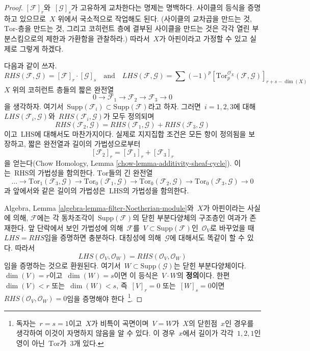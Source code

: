 \begin{proof}
$[\mathcal{F}]_r$와\  $[\mathcal{G}]_s$가 고유하게 교차한다는 명제는
명백하다. 사이클의 등식을 증명하고 있으므로\  $X$ 위에서 국소적으로
작업해도 된다. (사이클의 교차곱을 만드는 것, $\text{Tor}$-층을 만드는 것,
그리고 코히런트 층에 결부된 사이클을 만드는 것은 각각 열린 부분스킴으로의
제한과 가환함을 관찰하라.) 따라서\  $X$가 아핀이라고 가정할 수 있고 실제로
그렇게 하겠다.

\medskip\noindent
다음과 같이 쓰자.
$$
RHS(\mathcal{F}, \mathcal{G}) = [\mathcal{F}]_r \cdot [\mathcal{G}]_s
\quad\text{and}\quad
LHS(\mathcal{F}, \mathcal{G}) = \sum (-1)^p
[\text{Tor}_p^{\mathcal{O}_X}(\mathcal{F}, \mathcal{G})]_{r + s - \dim(X)}
$$
$X$ 위의 코히런트 층들의 짧은 완전열
$$
0 \to \mathcal{F}_1 \to \mathcal{F}_2 \to \mathcal{F}_3 \to 0
$$
을 생각하자. 여기서\ 
$\text{Supp}(\mathcal{F}_i) \subset \text{Supp}(\mathcal{F})$라고 하자.
그러면\  $i = 1, 2, 3$에 대해\  $LHS(\mathcal{F}_i, \mathcal{G})$와\ 
$RHS(\mathcal{F}_i, \mathcal{G})$가 모두 정의되며
$$
RHS(\mathcal{F}_2, \mathcal{G}) =
RHS(\mathcal{F}_1, \mathcal{G}) + RHS(\mathcal{F}_3, \mathcal{G})
$$
이고\  LHS에 대해서도 마찬가지이다. 실제로 지지집합 조건은 모든 항이
정의됨을 보장하고, 짧은 완전열과 길이의 가법성으로부터
$$
[\mathcal{F}_2]_r = [\mathcal{F}_1]_r  + [\mathcal{F}_3]_r
$$
을 얻는다(Chow Homology, Lemma \ref{chow-lemma-additivity-sheaf-cycle}).
이는\  RHS의 가법성을 함의한다. $\text{Tor}$들의 긴 완전열
$$
\ldots \to \text{Tor}_1(\mathcal{F}_3, \mathcal{G}) \to
\text{Tor}_0(\mathcal{F}_1, \mathcal{G}) \to
\text{Tor}_0(\mathcal{F}_2, \mathcal{G}) \to
\text{Tor}_0(\mathcal{F}_3, \mathcal{G}) \to 0
$$
과 앞에서와 같은 길이의 가법성은\  LHS의 가법성을 함의한다.

\medskip\noindent
Algebra, Lemma \ref{algebra-lemma-filter-Noetherian-module}와\  $X$가 아핀이라는
사실에 의해, $\mathcal{F}$에는 각 동차조각이\ 
$\text{Supp}(\mathcal{F})$의 닫힌 부분다양체의 구조층인 여과가 존재한다.
앞 단락에서 보인 가법성에 의해\  $\mathcal{F}$를\ 
$V \subset \text{Supp}(\mathcal{F})$인\  $\mathcal{O}_V$로 바꾸었을 때\ 
$LHS = RHS$임을 증명하면 충분하다. 대칭성에 의해\  $\mathcal{G}$에 대해서도
똑같이 할 수 있다. 따라서
$$
LHS(\mathcal{O}_V, \mathcal{O}_W) = RHS(\mathcal{O}_V, \mathcal{O}_W)
$$
임을 증명하는 것으로 환원된다. 여기서\ 
$W \subset \text{Supp}(\mathcal{G})$는 닫힌 부분다양체이다.
$\dim(V) = r$이고\  $\dim(W) = s$이면 이 등식은\  $V \cdot W$의
{\bf 정의}이다. 한편\  $\dim(V) < r$ 또는\  $\dim(W) < s$, 즉\ 
$[V]_r = 0$ 또는\  $[W]_s = 0$이면\ 
$RHS(\mathcal{O}_V, \mathcal{O}_W) = 0$임을 증명해야 한다\ 
\footnote{독자는\  $r = s = 1$이고\  $X$가 비특이 곡면이며\  $V = W$가\ 
$X$의 닫힌점\  $x$인 경우를 생각하여 이것이 자명하지 않음을 알 수 있다.
이 경우\  $x$에서 길이가 각각\  $1, 2, 1$인 영이 아닌\  $\text{Tor}$가\ 
$3$개 있다.}.


\end{proof}
